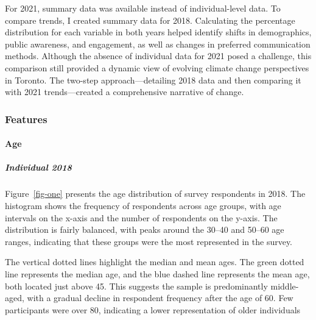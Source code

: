 \documentclass[
  letterpaper,
  DIV=11,
  numbers=noendperiod]{scrartcl}
\let\oldparagraph\paragraph
\renewcommand{\paragraph}[1]{\oldparagraph{#1}\mbox{}}
\let\oldsubparagraph\subparagraph
\renewcommand{\subparagraph}[1]{\oldsubparagraph{#1}\mbox{}}
\begin{document}
For 2021, summary data was available instead of individual-level data.
To compare trends, I created summary data for 2018. Calculating the
percentage distribution for each variable in both years helped identify
shifts in demographics, public awareness, and engagement, as well as
changes in preferred communication methods. Although the absence of
individual data for 2021 posed a challenge, this comparison still
provided a dynamic view of evolving climate change perspectives in
Toronto. The two-step approach---detailing 2018 data and then comparing
it with 2021 trends---created a comprehensive narrative of change.

\subsubsection{Features}\label{features}

\paragraph{Age}\label{age}

\subparagraph{Individual 2018}\label{individual-2018}

Figure~\ref{fig-one} presents the age distribution of survey respondents
in 2018. The histogram shows the frequency of respondents across age
groups, with age intervals on the x-axis and the number of respondents
on the y-axis. The distribution is fairly balanced, with peaks around
the 30--40 and 50--60 age ranges, indicating that these groups were the
most represented in the survey.

The vertical dotted lines highlight the median and mean ages. The green
dotted line represents the median age, and the blue dashed line
represents the mean age, both located just above 45. This suggests the
sample is predominantly middle-aged, with a gradual decline in
respondent frequency after the age of 60. Few participants were over 80,
indicating a lower representation of older individuals
\end{document}
